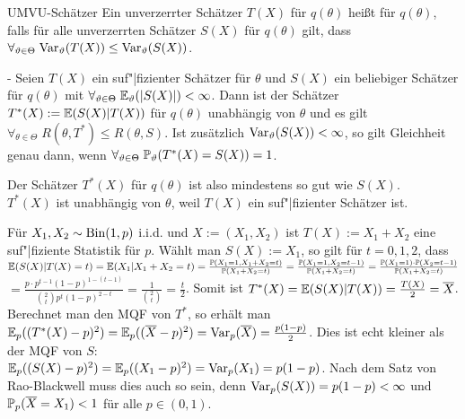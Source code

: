 \begin{Def}{UMVU-Schätzer}
    Ein unverzerrter Schätzer $T(X)$ für $q(\theta)$ heißt
     für $q(\theta)$, falls
    für alle unverzerrten Schätzer $S(X)$ für $q(\theta)$ gilt, dass
    $\forall_{\vartheta \in \Theta}\; \mathrm{Var}_\vartheta(T(X)) \le \mathrm{Var}_\vartheta(S(X))$.
\end{Def}

\begin{Satz}{-}
    Seien $T(X)$ ein suf"|fizienter Schätzer für $\theta$ und $S(X)$ ein beliebiger Schätzer für
    $q(\theta)$ mit $\forall_{\vartheta \in \Theta}\; \mathbb{E}_\vartheta(|S(X)|) < \infty$.
    Dann ist der Schätzer $T^\ast(X) := \mathbb{E}(S(X)|T(X))$ für $q(\theta)$
    unabhängig von $\theta$ und es gilt
    $\forall_{\theta \in \Theta}\; R(\theta, T^\ast) \le R(\theta, S)$.
    Ist zusätzlich $\mathrm{Var}_\vartheta(S(X)) < \infty$, so gilt Gleichheit genau dann, wenn
    $\forall_{\vartheta \in \Theta}\; \mathbb{P}_\vartheta(T^\ast(X) = S(X)) = 1$.
\end{Satz}

\begin{Bem}
    Der Schätzer $T^\ast(X)$ für $q(\theta)$ ist also mindestens so gut wie $S(X)$.\\
    $T^\ast(X)$ ist unabhängig von $\theta$, weil $T(X)$ ein suf"|fizienter Schätzer ist.
\end{Bem}

\linie

\begin{Bsp}
    Für $X_1, X_2 \sim \operatorname{Bin}(1, p)$ i.i.d. und $X := (X_1, X_2)$ ist $T(X) := X_1 + X_2$ eine
    suf"|fiziente Statistik für $p$.
    Wählt man $S(X) := X_1$, so gilt für $t = 0, 1, 2$, dass\\
    $\mathbb{E}(S(X)|T(X)=t) = \mathbb{E}(X_1|X_1+X_2 = t) =
    \frac{\mathbb{P}(X_1 = 1, X_1 + X_2 = t)}{\mathbb{P}(X_1 + X_2 = t)} =
    \frac{\mathbb{P}(X_1 = 1, X_2 = t - 1)}{\mathbb{P}(X_1 + X_2 = t)} =
    \frac{\mathbb{P}(X_1 = 1) \cdot \mathbb{P}(X_2 = t - 1)}{\mathbb{P}(X_1 + X_2 = t)}$\\
    $= \frac{p \cdot p^{t-1} (1-p)^{1-(t-1)}}{\binom{2}{t} p^t (1 - p)^{2-t}} =
    \frac{1}{\binom{2}{t}} =
    \frac{t}{2}$.
    Somit ist $T^\ast(X) = \mathbb{E}(S(X)|T(X)) = \frac{T(X)}{2} = \overline{X}$.\\
    Berechnet man den MQF von $T^\ast$, so erhält man\\
    $\mathbb{E}_p((T^\ast(X) - p)^2) = \mathbb{E}_p((\overline{X}-p)^2) = \mathrm{Var}_p(\overline{X}) =
    \frac{p(1-p)}{2}$.
    Dies ist echt kleiner als der MQF von $S$:\\
    $\mathbb{E}_p((S(X) - p)^2) = \mathbb{E}_p((X_1 - p)^2) = \mathrm{Var}_p(X_1) = p(1-p)$.
    Nach dem Satz von Rao-Blackwell muss dies auch so sein, denn $\mathrm{Var}_p(S(X)) = p(1-p) < \infty$
    und $\mathbb{P}_p(\overline{X} = X_1) < 1$ für alle $p \in (0, 1)$.
\end{Bsp}

